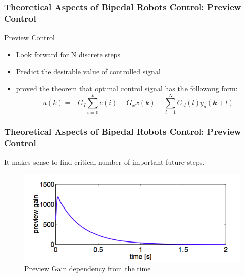\documentclass{beamer}
\begin{document}

	\begin{frame}
		\frametitle{Theoretical Aspects of Bipedal Robots Control: Preview Control}
		\begin{block}{Preview Control}
			\begin{itemize}
				\item
					 Look forward for N discrete steps
				\item
					Predict the desirable value of controlled signal
				\item
					\cite{katayama1985design} proved the theorem that optimal control signal has the followong form:
					\begin{equation}
						u(k) = -G_I \sum^{k}_{i=0} e(i) - G_xx(k) - \sum^{N}_{l=1}G_d(l)y_d(k+l)
					\end{equation}
			\end{itemize}
		\end{block}
	\end{frame}
	

	\begin{frame}
		\frametitle{Theoretical Aspects of Bipedal Robots Control: Preview Control}
		It makes sense to find critical number of important future steps.
		\begin{figure}[h!]
			\begin{minipage}[H]{\linewidth}
				\centering
				\includegraphics[width=0.7\linewidth]{presentation_images/16}
				\caption{Preview Gain dependency from the time \cite{kajita2003biped}}
			\end{minipage}
		\end{figure}
	\end{frame}
	
\end{document}
